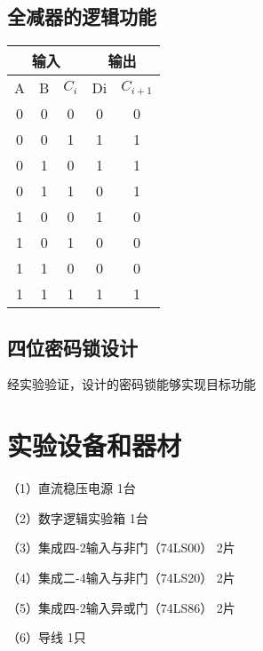 \documentclass{article}
\begin{document}
\subsection{全减器的逻辑功能}
\begin{table}[h]
  \centering  
  \begin{tabular}{c|c|c|c|c}
      \hline
      \multicolumn{3}{c}{输入} \vline  &  \multicolumn{2}{c}{输出} \vline     \\ \hline
            A             & B    &$C_i $   &  Di               & $ C_{i+1} $  \\ \hline
            0             & 0    &0        &   0               & 0            \\ \hline
            0             & 0    &1        &   1               & 1            \\ \hline
            0             & 1    &0        &   1               & 1            \\ \hline
            0             & 1    &1        &   0               & 1            \\ \hline
            1             & 0    &0        &   1               & 0            \\ \hline
            1             & 0    &1        &   0               & 0            \\ \hline
            1             & 1    &0        &   0               & 0            \\ \hline
            1             & 1    &1        &   1               & 1            \\ \hline
          \end{tabular}
 \end{table}
 \subsection{四位密码锁设计}
 经实验验证，设计的密码锁能够实现目标功能




	\section{ 实验设备和器材}
	（1）直流稳压电源             \qquad \quad \qquad \qquad \qquad \qquad           1台\par
	（2）数字逻辑实验箱            \qquad  \qquad \qquad \qquad\qquad                1台\par
	（3）集成四-2输入与非门（74LS00） \qquad    \quad                                    2片\par
  （4）集成二-4输入与非门（74LS20） \qquad    \quad                                    2片\par
  （5）集成四-2输入异或门（74LS86） \qquad    \quad                                    2片\par
 	（6）导线                 \quad    \qquad  \qquad \qquad \qquad \qquad \qquad \qquad  1只\par
  
\end{document}
